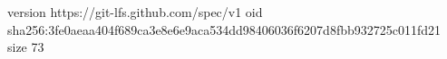 version https://git-lfs.github.com/spec/v1
oid sha256:3fe0aeaa404f689ca3e8e6e9aca534dd98406036f6207d8fbb932725c011fd21
size 73
